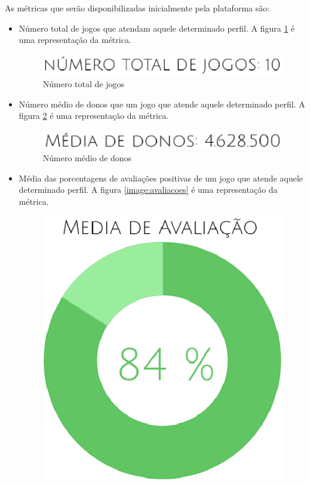 As métricas que serão disponibilizadas inicialmente pela plataforma são:
\begin{itemize}
	\item Número total de jogos que atendam aquele determinado perfil. A figura \ref{image:num_total} é uma representação da métrica.
	\begin{figure}
	\centering
	\includegraphics[scale=0.5]{figuras/num_jogos.eps}
	\caption{Número total de jogos}
	\label{image:num_total}
	\end{figure}
	\item Número médio de donos que um jogo que atende aquele determinado perfil. A figura \ref{image:med_donos} é uma representação da métrica.
	\begin{figure}
	\centering
	\includegraphics[scale=0.5]{figuras/media_donos.eps}
	\caption{Número médio de donos}
	\label{image:med_donos}
	\end{figure}
	\item Média das porcentagens de avaliações positivas de um jogo que atende aquele determinado perfil. A figura \ref{image:avaliacoes} é uma representação da métrica.
	\begin{figure}
	\centering
	\includegraphics[scale=0.3]{figuras/avaliacao.eps}

\end{figure}
\end{itemize}
